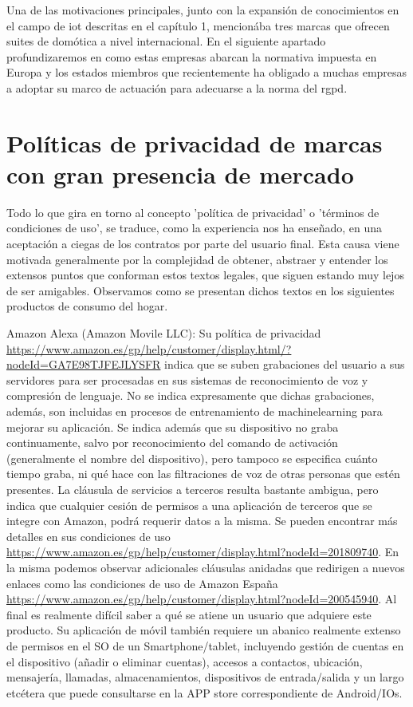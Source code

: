 \vspace{1cm}

Una de las motivaciones principales, junto con la expansión de conocimientos en el campo de \gls{iot}  descritas en el capítulo 1, mencionába tres marcas que ofrecen suites de domótica a nivel internacional. En el siguiente apartado profundizaremos en como estas empresas abarcan la normativa impuesta en Europa y los estados miembros que recientemente ha obligado a muchas empresas a adoptar su marco de actuación para adecuarse a la norma del \gls{rgpd}.


\section{Políticas de privacidad de marcas con gran presencia de mercado}
\label{ch:Capitulo2.1}

Todo lo que gira en torno al concepto 'política de privacidad' o 'términos de condiciones de uso', se traduce, como la experiencia nos ha enseñado, en una aceptación a ciegas de los contratos por parte del usuario final. Esta causa viene motivada generalmente por la complejidad de obtener, abstraer y entender los extensos puntos que conforman estos textos legales, que siguen estando muy lejos de ser amigables. Observamos como se presentan dichos textos en los siguientes productos de consumo del hogar.

\vspace{1.5cm}

Amazon Alexa (Amazon Movile LLC): Su política de privacidad \url{https://www.amazon.es/gp/help/customer/display.html/?nodeId=GA7E98TJFEJLYSFR} indica que se suben grabaciones del usuario a sus servidores para ser procesadas en sus sistemas de reconocimiento de voz y compresión de lenguaje. No se indica expresamente que dichas grabaciones, además, son incluidas en procesos de entrenamiento de \gls{machinelearning} para mejorar su aplicación. Se indica además que su dispositivo no graba continuamente, salvo por reconocimiento del comando de activación (generalmente el nombre del dispositivo), pero tampoco se especifica cuánto tiempo graba, ni qué hace con las filtraciones de voz de otras personas que estén presentes. La cláusula de servicios a terceros resulta bastante ambigua, pero indica que cualquier cesión de permisos a una aplicación de terceros que se integre con Amazon, podrá requerir datos a la misma. Se pueden encontrar más detalles en sus condiciones de uso \url{https://www.amazon.es/gp/help/customer/display.html?nodeId=201809740}. En la misma podemos observar adicionales cláusulas anidadas que redirigen a nuevos enlaces como las condiciones de uso de Amazon España \url{https://www.amazon.es/gp/help/customer/display.html?nodeId=200545940}. Al final es realmente difícil saber a qué se atiene un usuario que adquiere este producto. Su aplicación de móvil también requiere un abanico realmente extenso de permisos en el SO de un Smartphone/tablet, incluyendo gestión de cuentas en el dispositivo (añadir o eliminar cuentas), accesos a contactos, ubicación, mensajería, llamadas, almacenamientos, dispositivos de entrada/salida y un largo etcétera que puede consultarse en la APP store correspondiente de Android/IOs.

